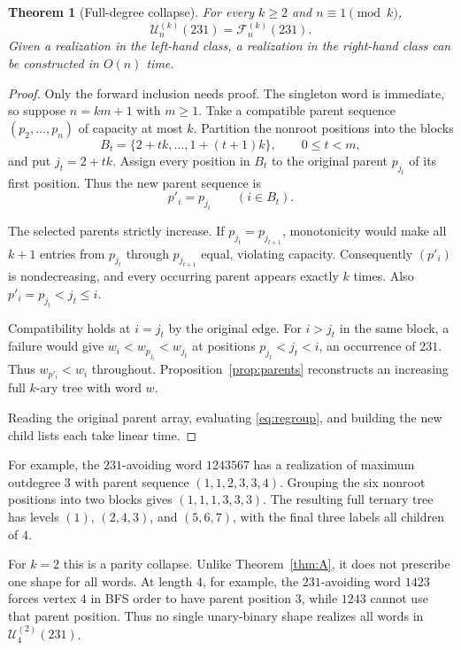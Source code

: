 \documentclass[11pt]{article}
\newtheorem{theorem}{Theorem}[section]
\theoremstyle{definition}
\newcommand{\UB}{\mathcal U}
\newcommand{\FB}{\mathcal F}
\begin{document}
\begin{theorem}[Full-degree collapse]\label{thm:B}
For every $k\ge2$ and $n\equiv1\pmod{k}$,
\[
\UB_n^{(k)}(231)=\FB_n^{(k)}(231).
\]
Given a realization in the left-hand class, a realization in the right-hand class can be constructed in $O(n)$ time.
\end{theorem}
\begin{proof}
Only the forward inclusion needs proof. The singleton word is immediate, so suppose $n=km+1$ with $m\ge1$. Take a compatible parent sequence $(p_2,\ldots,p_n)$ of capacity at most $k$. Partition the nonroot positions into the blocks
\[
B_t=\{2+tk,\ldots,1+(t+1)k\},\qquad 0\le t<m,
\]
and put $j_t=2+tk$. Assign every position in $B_t$ to the original parent $p_{j_t}$ of its first position. Thus the new parent sequence is
\begin{equation}
p'_i=p_{j_t}\qquad(i\in B_t).\label{eq:regroup}
\end{equation}

The selected parents strictly increase. If $p_{j_t}=p_{j_{t+1}}$, monotonicity would make all $k+1$ entries from $p_{j_t}$ through $p_{j_{t+1}}$ equal, violating capacity. Consequently $(p'_i)$ is nondecreasing, and every occurring parent appears exactly $k$ times. Also $p'_i=p_{j_t}<j_t\le i$.

Compatibility holds at $i=j_t$ by the original edge. For $i>j_t$ in the same block, a failure would give $w_i<w_{p_{j_t}}<w_{j_t}$ at positions $p_{j_t}<j_t<i$, an occurrence of $231$. Thus $w_{p'_i}<w_i$ throughout. Proposition~\ref{prop:parents} reconstructs an increasing full $k$-ary tree with word $w$.

Reading the original parent array, evaluating \eqref{eq:regroup}, and building the new child lists each take linear time.
\end{proof}

For example, the $231$-avoiding word $1243567$ has a realization of maximum outdegree $3$ with parent sequence $(1,1,2,3,3,4)$. Grouping the six nonroot positions into two blocks gives $(1,1,1,3,3,3)$. The resulting full ternary tree has levels $(1)$, $(2,4,3)$, and $(5,6,7)$, with the final three labels all children of $4$.

For $k=2$ this is a parity collapse. Unlike Theorem~\ref{thm:A}, it does not prescribe one shape for all words. At length $4$, for example, the $231$-avoiding word $1423$ forces vertex $4$ in BFS order to have parent position $3$, while $1243$ cannot use that parent position. Thus no single unary-binary shape realizes all words in $\UB_4^{(2)}(231)$.
\end{document}
